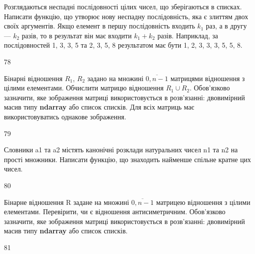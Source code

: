 Розглядаються неспадні послідовності цілих чисел, що зберігаються в списках. Написати функцію, що утворює нову неспадну послідовність, яка є злиттям двох своїх аргументів. Якщо елемент в першу послідовність входить $k_1$ раз, а в другу --- $k_2$ разів, то в результат він має входити $k_1+k_2$ разів. Наприклад, за послідовностей 1, 3, 3, 5 та 2, 3, 5, 8 результатом має бути 1, 2, 3, 3, 3, 5, 5, 8.
\\\par
78 














Бінарні відношення $R_1$, $R_2$ задано на множині $\overline{0,n-1}$ матрицями відношення з цілими елементами. Обчислити матрицю відношення $R_1\cup R_2$. Обов'язково зазначити, яке зображення матриці використовується в розв'язанні: двовимірний масив типу \textbf{ndarray} або список списків. Для всіх матриць має використовуватись однакове зображення.
\\\par
79 














Словники a1 та a2 містять канонічні розклади натуральних чисел n1 та n2 на прості множники. Написати функцію, що знаходить найменше спільне кратне цих чисел.
\\\par
80 














Бінарне відношення R задане на множині $\overline{0,n-1}$ матрицею відношення з цілими елементами.  Перевірити, чи є відношення антисиметричним. Обов'язково зазначити, яке зображення матриці використовується в розв'язанні: двовимірний масив типу \textbf{ndarray} або список списків.
\\\par
81 














